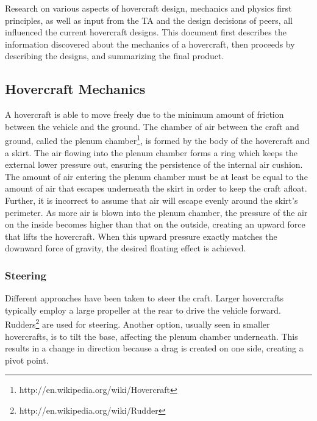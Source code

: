 Research on various aspects of hovercraft design, mechanics and physics first principles, as well as input from the TA and the design decisions of peers, all influenced the current hovercraft designs. This document first describes the information discovered about the mechanics of a hovercraft, then proceeds by describing the designs, and summarizing the final product.

\subsection{Hovercraft Mechanics}
A hovercraft is able to move freely due to the minimum amount of friction between the vehicle and the ground. The chamber of air between the craft and ground, called the plenum chamber\footnote{http://en.wikipedia.org/wiki/Hovercraft}, is formed by the body of the hovercraft and a skirt. The air flowing into the plenum chamber forms a ring which keeps the external lower pressure out, ensuring the persistence of the internal air cushion. The amount of air entering the plenum chamber must be at least be equal to the amount of air that escapes underneath the skirt in order to keep the craft afloat. Further, it is incorrect to assume that air will escape evenly around the skirt’s perimeter. As more air is blown into the plenum chamber, the pressure of the air on the inside becomes higher than that on the outside, creating an upward force that lifts the hovercraft. When this upward pressure exactly matches the downward force of gravity, the desired floating effect is achieved. \cite{CambridgeJournals:370274} \cite{831309}

\subsubsection{Steering}
Different approaches have been taken to steer the craft. Larger hovercrafts typically employ a large propeller at the rear to drive the vehicle forward. Rudders\footnote{http://en.wikipedia.org/wiki/Rudder} are used for steering. Another option, usually seen in smaller hovercrafts, is to tilt the base, affecting the plenum chamber underneath. This results in a change in direction because a drag is created on one side, creating a pivot point.

